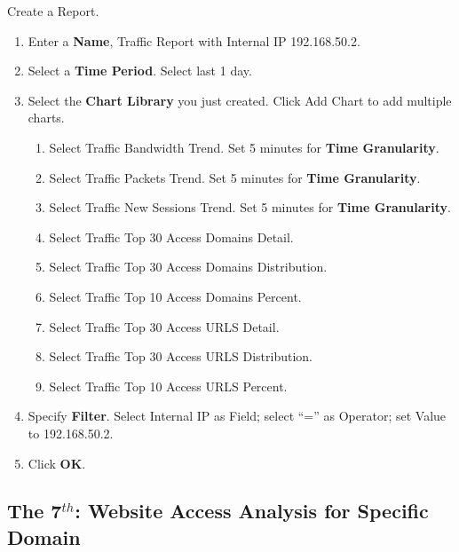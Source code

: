 \begin{description}
\begin{enumerate}
\begin{enumerate}
        \end{enumerate}
    \end{enumerate}
    \item[STEP 3.]	Create a Report. 
    \begin{enumerate}
        \item 	Enter a \textbf{Name}, Traffic Report with Internal IP 192.168.50.2. 
        \item 	Select a \textbf{Time Period}. Select last 1 day.
        \item 	Select the \textbf{Chart Library} you just created. Click Add Chart to add multiple charts.
        \begin{enumerate}
            \item	Select Traffic Bandwidth Trend. Set 5 minutes for \textbf{Time Granularity}.
            \item	Select Traffic Packets Trend. Set 5 minutes for \textbf{Time Granularity}.
            \item	Select Traffic New Sessions Trend. Set 5 minutes for \textbf{Time Granularity}.
            \item	Select Traffic Top 30 Access Domains Detail.
            \item	Select Traffic Top 30 Access Domains Distribution.
            \item	Select Traffic Top 10 Access Domains Percent.
            \item	Select Traffic Top 30 Access URLS Detail.
            \item	Select Traffic Top 30 Access URLS Distribution.
            \item	Select Traffic Top 10 Access URLS Percent.
        \end{enumerate}
        \item 	Specify \textbf{Filter}. Select Internal IP as Field; select “=” as Operator; set Value to 192.168.50.2.  
        \item 	Click \textbf{OK}.
    \end{enumerate}
\end{description}

\subsection*{\hypertarget{link:The 7th: Website Access Analysis for Specific Domain}{The 7$^{th}$: Website Access Analysis for Specific Domain}}
\label{sec:appendix_f:report:7th}

